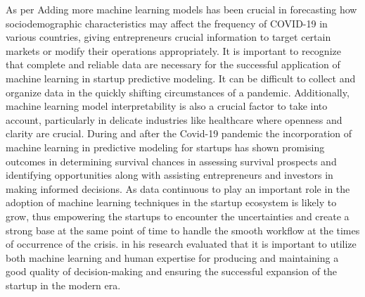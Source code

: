 \documentclass[12pt]{article}
\begin{document}
As per \citep{verma2022machine} Adding more machine learning models has been crucial in forecasting how sociodemographic characteristics may affect the frequency of COVID-19 in various countries, giving entrepreneurs crucial information to target certain markets or modify their operations appropriately. It is important to recognize that complete and reliable data are necessary for the successful application of machine learning in startup predictive modeling. It can be difficult to collect and organize data in the quickly shifting circumstances of a pandemic. Additionally, machine learning model interpretability is also a crucial factor to take into account, particularly in delicate industries like healthcare where openness and clarity are crucial. During and after the Covid-19 pandemic the incorporation of machine learning in predictive modeling for startups has shown promising outcomes in determining survival chances in assessing survival prospects and identifying opportunities along with assisting entrepreneurs and investors in making informed decisions. As data continuous to play an important role in the adoption of machine learning techniques in the startup ecosystem is likely to grow, thus empowering the startups to encounter the uncertainties and create a strong base at the same point of time to handle the smooth workflow at the times of occurrence of the crisis. 
\citep{mukul2023innovative} in his research evaluated that it is important to utilize both machine learning and human expertise for producing and maintaining a good quality of decision-making and ensuring the successful expansion of the startup in the modern era. 
\end{document}
